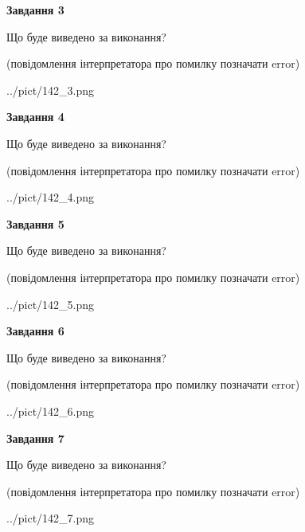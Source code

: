 \documentclass[12pt, ukrainian]{article}
\begin{document}
{\begin {large}
{\begin {center}\textbf{Завдання 3}\end {center}}\par
Що буде виведено за виконання?\par
 (повідомлення інтерпретатора про помилку позначати error)\par
\begin{center}
	{../pict/142_3.png}
\end{center}
\newpage

{\begin {center}\textbf{Завдання 4}\end {center}}\par
Що буде виведено за виконання?\par
 (повідомлення інтерпретатора про помилку позначати error)\par
\begin{center}
	{../pict/142_4.png}
\end{center}
\newpage

{\begin {center}\textbf{Завдання 5}\end {center}}\par
Що буде виведено за виконання?\par
 (повідомлення інтерпретатора про помилку позначати error)\par
\begin{center}
	{../pict/142_5.png}
\end{center}
\newpage

{\begin {center}\textbf{Завдання 6}\end {center}}\par
Що буде виведено за виконання?\par
 (повідомлення інтерпретатора про помилку позначати error)\par
\begin{center}
	{../pict/142_6.png}
\end{center}
\newpage

{\begin {center}\textbf{Завдання 7}\end {center}}\par
Що буде виведено за виконання?\par
 (повідомлення інтерпретатора про помилку позначати error)\par
\begin{center}
	{../pict/142_7.png}
\end{center}
\newpage


\end{large}}
\end{document}
